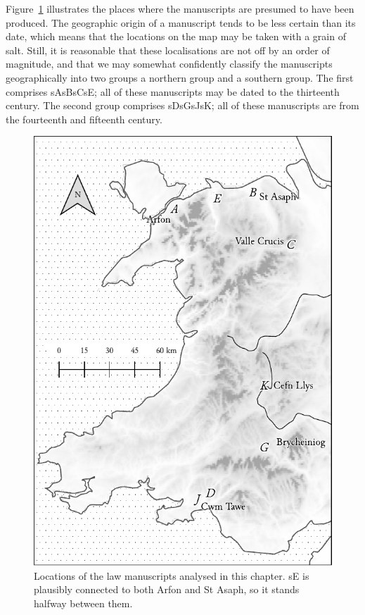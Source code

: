 Figure~\ref{fig:mslocs} illustrates the places where the manuscripts are presumed to have been produced. The geographic origin of a manuscript tends to be less certain than its date, which means that the locations on the map may be taken with a grain of salt. Still, it is reasonable that these localisations are not off by an order of magnitude, and that we may somewhat confidently classify the manuscripts geographically into two groups a northern group and a southern group. The first  comprises \gls{sA}\gls{sB}\gls{sC}\gls{sE}; all of these manuscripts may be dated to the thirteenth century. The second group  comprises \gls{sD}\gls{sG}\gls{sJ}\gls{sK}; all of these manuscripts are from the fourteenth and fifteenth century.

\begin{figure}[h]
  \centering
  \includegraphics{3orth/images/mslocations.pdf}
  \caption[Locations of the law manuscripts.]{Locations of the law manuscripts analysed in this chapter. \gls{sE} is plausibly connected to both Arfon and St Asaph, so it stands halfway between them.}
  \label{fig:mslocs}
\end{figure}

